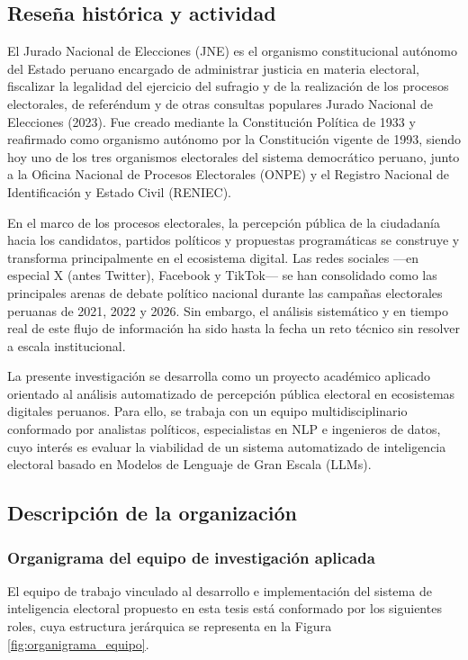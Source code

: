 \documentclass[listof=nochaptergap,12pt,times,authoryear]{report}
\begin{document}
\subsection{Reseña histórica y actividad}
 
El Jurado Nacional de Elecciones (JNE) es el organismo constitucional autónomo del
Estado peruano encargado de administrar justicia en materia electoral, fiscalizar la
legalidad del ejercicio del sufragio y de la realización de los procesos electorales, de
referéndum y de otras consultas populares Jurado Nacional de Elecciones (2023). Fue creado
mediante la Constitución Política de 1933 y reafirmado como organismo autónomo por la
Constitución vigente de 1993, siendo hoy uno de los tres organismos electorales del
sistema democrático peruano, junto a la Oficina Nacional de Procesos Electorales (ONPE)
y el Registro Nacional de Identificación y Estado Civil (RENIEC).
 
En el marco de los procesos electorales, la percepción pública de la ciudadanía hacia
los candidatos, partidos políticos y propuestas programáticas se construye y transforma
principalmente en el ecosistema digital. Las redes sociales —en especial X (antes Twitter),
Facebook y TikTok— se han consolidado como las principales arenas de debate político
nacional durante las campañas electorales peruanas de 2021, 2022 y 2026. Sin embargo,
el análisis sistemático y en tiempo real de este flujo de información ha sido hasta la fecha
un reto técnico sin resolver a escala institucional.
 
La presente investigación se desarrolla como un proyecto académico aplicado orientado al análisis automatizado de percepción pública electoral en ecosistemas digitales peruanos. Para ello, se trabaja con un equipo multidisciplinario conformado por analistas políticos, especialistas en NLP e ingenieros de datos, cuyo interés es evaluar la viabilidad de un sistema automatizado de inteligencia electoral basado en Modelos de Lenguaje de Gran Escala (LLMs).
 
\subsection{Descripción de la organización}
 
\subsubsection{Organigrama del equipo de investigación aplicada}
 
El equipo de trabajo vinculado al desarrollo e implementación del sistema de
inteligencia electoral propuesto en esta tesis está conformado por los siguientes roles, cuya
estructura jerárquica se representa en la Figura \ref{fig:organigrama_equipo}.
 
\end{document}
